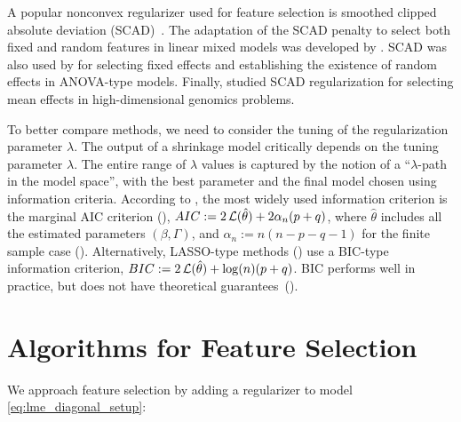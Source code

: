  A popular nonconvex regularizer used for feature selection is smoothed clipped absolute deviation (SCAD)~\cite{Fan2001}. 
The adaptation of the SCAD penalty to select both fixed and random features in 
linear mixed models was developed by \cite{Fan2012}. SCAD was also used by \cite{chen2015inference} for selecting fixed effects and establishing the existence of random effects in ANOVA-type models. Finally, \cite{Ghosh2018} studied SCAD regularization for selecting mean effects in high-dimensional genomics problems.

To better compare methods, we need to consider the tuning of the regularization parameter 
$\lambda$. 
The output of a shrinkage model critically depends on the tuning parameter 
$\lambda$. The entire range of $\lambda$ values is captured 
by the notion of a ``$\lambda$-path in the model space'', with  the best parameter and the final model chosen using information criteria. According to \cite{Muller2013}, the most widely used information criterion is the marginal AIC criterion (\cite{Vaida2005}),
 \(  AIC := 2\operatorname{\mathcal{L}}(\hat{\theta}) + 2\alpha_n(p+q)\), 
  where $\hat\theta$ includes all the estimated parameters $(\beta, \Gamma)$, and $\alpha_n := n(n-p-q-1)$ for the finite sample case (\cite{Sugiura1978}). 
  Alternatively, LASSO-type methods (\cite{Krishna2008, Ibrahim2011}) use a BIC-type information criterion,  \(BIC := 2\operatorname{\mathcal{L}}(\hat{\theta}) + \log(n)(p+q)\).
BIC performs well in practice, but does not have theoretical guarantees~(\cite{schelldorfer2011estimation}).
  
  
\section{Algorithms for Feature Selection}
\label{sec:pgd_methods}
We approach feature selection by adding a regularizer to model \eqref{eq:lme_diagonal_setup}: 


